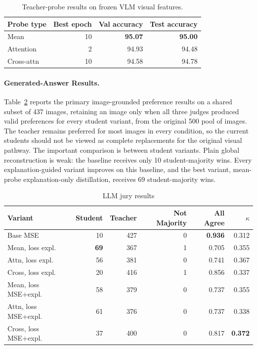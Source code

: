 \documentclass{article}
\begin{document}
\begin{table}[H]
  \centering
  \caption{Teacher-probe results on frozen VLM visual features.}
  \label{tab:probe-results}
  \small
  \begin{tabular}{@{}lrrr@{}}
    \toprule
    Probe type & Best epoch & Val accuracy & Test accuracy  \\
    \midrule
    Mean & 10 & \textbf{95.07} & \textbf{95.00} \\
    Attention & 2 & 94.93 & 94.48 \\
    Cross-attn & 10 & 94.58 & 94.78 \\
    \bottomrule
  \end{tabular}
\end{table}


\paragraph{Generated-Answer Results.}

Table~\ref{tab:primary-results} reports the primary image-grounded preference results on a shared subset of 437 images, retaining an image only when all three judges produced valid preferences for every student variant, from the original 500 pool of images.
The teacher remains preferred for most images in every condition, so the current students should not be viewed as complete replacements for the original visual pathway.
The important comparison is between student variants.
Plain global reconstruction is weak: the baseline receives only 10 student-majority wins.
Every explanation-guided variant improves on this baseline, and the best variant, mean-probe explanation-only distillation, receives 69 student-majority wins.


\begin{table}[t]
  \centering
  \caption{LLM jury results}
  \label{tab:primary-results}
  \scriptsize
  \setlength{\tabcolsep}{2.2pt}
  \begin{tabular}{@{}lrrrrr@{}}
    \toprule
    Variant & Student & Teacher & Not Majority & All Agree &  $\kappa$ \\
    \midrule
    Base MSE & 10 & 427 & 0 & \textbf{0.936} &  0.312 \\
    Mean, loss expl. & \textbf{69} & 367 & 1 & 0.705 &  0.355 \\
    Attn, loss expl. & 56 & 381 & 0 & 0.741 &  0.367 \\
    Cross, loss expl. & 20 & 416 & 1 & 0.856 &  0.337 \\
    Mean, loss MSE+expl. & 58 & 379 & 0 & 0.737 &  0.355 \\
    Attn, loss MSE+expl. & 61 & 376 & 0 & 0.737 &  0.338 \\
    Cross, loss MSE+expl. & 37 & 400 & 0 & 0.817 &  \textbf{0.372} \\
    \bottomrule
  \end{tabular}
\end{table}
\end{document}
